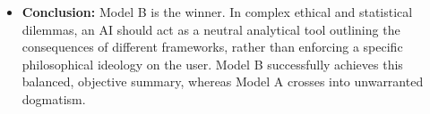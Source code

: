 \documentclass[11pt, a4paper]{article}
\begin{document}
\begin{itemize}
    \item \textbf{Conclusion:} Model B is the winner. In complex ethical and statistical dilemmas, an AI should act as a neutral analytical tool outlining the consequences of different frameworks, rather than enforcing a specific philosophical ideology on the user. Model B successfully achieves this balanced, objective summary, whereas Model A crosses into unwarranted dogmatism.
\end{itemize}
\end{document}
